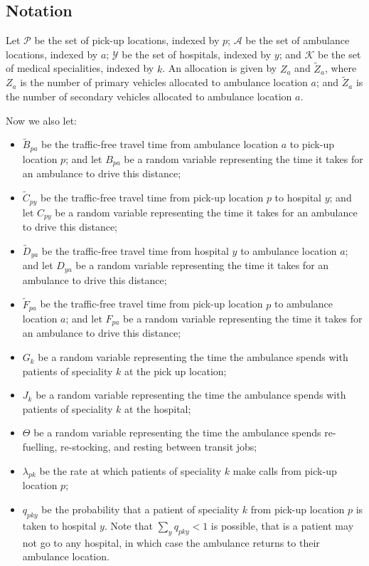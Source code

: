 \documentclass[preprint,12pt]{elsarticle}
\begin{document}
\subsection{Notation}\label{sec:simulation_notation}
Let $\mathcal{P}$ be the set of pick-up locations, indexed by $p$; $\mathcal{A}$ be the set of ambulance locations, indexed by $a$; $\mathcal{Y}$ be the set of hospitals, indexed by $y$; and $\mathcal{K}$ be the set of medical specialities, indexed by $k$.
An allocation is given by $Z_a$ and $\tilde{Z}_a$, where $Z_a$ is the number of primary vehicles allocated to ambulance location $a$; and $\tilde{Z}_a$ is the number of secondary vehicles allocated to ambulance location $a$.

Now we also let:
\begin{itemize}
  \item $\tilde{B}_{pa}$ be the traffic-free travel time from ambulance location
        $a$ to pick-up location $p$; and let $B_{pa}$ be a random variable
        representing the time it takes for an ambulance to drive this distance;
  \item $\tilde{C}_{py}$ be the traffic-free travel time from pick-up location
        $p$ to hospital $y$; and let $C_{py}$ be a random variable representing
        the time it takes for an ambulance to drive this distance;
  \item $\tilde{D}_{ya}$ be the traffic-free travel time from hospital $y$ to
        ambulance location $a$; and let $D_{ya}$ be a random variable
        representing the time it takes for an ambulance to drive this distance;
  \item $\tilde{F}_{pa}$ be the traffic-free travel time from pick-up location
        $p$ to ambulance location $a$; and let $F_{pa}$ be a random variable
        representing the time it takes for an ambulance to drive this distance;
  \item $G_k$ be a random variable representing the time the ambulance spends
        with patients of speciality $k$ at the pick up location;
  \item $J_k$ be a random variable representing the time the ambulance spends
        with patients of speciality $k$ at the hospital;
  \item $\Theta$ be a random variable representing the time the ambulance spends
        re-fuelling, re-stocking, and resting between transit jobs;
  \item $\lambda_{pk}$ be the rate at which patients of speciality $k$ make
        calls from pick-up location $p$;
  \item $q_{pky}$ be the probability that a patient of speciality $k$ from
        pick-up location $p$ is taken to hospital $y$.
        Note that $\sum_y q_{pky} < 1$ is possible, that is a patient may not go
        to any hospital, in which case the ambulance returns to their ambulance
        location.
\end{itemize}
\end{document}
